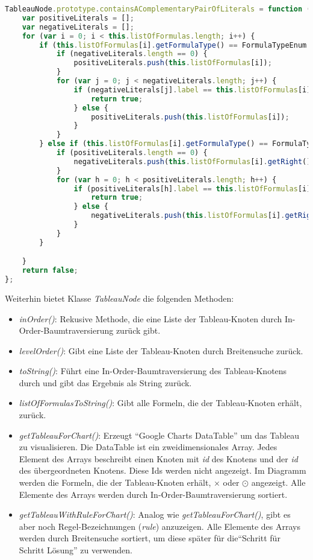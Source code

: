 \begin{itemize}
\begin{lstlisting}[language=JavaScript, caption= containsConstantFalse() (Klasse TableauNode), basicstyle=\scriptsize]
TableauNode.prototype.containsAComplementaryPairOfLiterals = function () {
    var positiveLiterals = [];
    var negativeLiterals = [];
    for (var i = 0; i < this.listOfFormulas.length; i++) {
        if (this.listOfFormulas[i].getFormulaType() == FormulaTypeEnum.POSITIVLITERAL) {
            if (negativeLiterals.length == 0) {
                positiveLiterals.push(this.listOfFormulas[i]);
            }
            for (var j = 0; j < negativeLiterals.length; j++) {
                if (negativeLiterals[j].label == this.listOfFormulas[i].getLabel()) {
                    return true;
                } else {
                    positiveLiterals.push(this.listOfFormulas[i]);
                }
            }
        } else if (this.listOfFormulas[i].getFormulaType() == FormulaTypeEnum.NEGATIVLITERAL) {
            if (positiveLiterals.length == 0) {
                negativeLiterals.push(this.listOfFormulas[i].getRight());
            }
            for (var h = 0; h < positiveLiterals.length; h++) {
                if (positiveLiterals[h].label == this.listOfFormulas[i].getRight().getLabel()) {
                    return true;
                } else {
                    negativeLiterals.push(this.listOfFormulas[i].getRight());
                }
            }
        }

    }
    return false;
};
\end{lstlisting}
\end{itemize}

Weiterhin bietet Klasse \textit{TableauNode} die folgenden Methoden:
\begin{itemize}
\item	\textit{inOrder()}: Rekusive Methode, die eine Liste der Tableau-Knoten durch In-Order-Baumtraversierung zurück gibt. 
\item	\textit{levelOrder()}: Gibt eine Liste der Tableau-Knoten durch Breitensuche zurück. 
\item	\textit{toString()}: Führt eine In-Order-Baumtraversierung des Tableau-Knotens durch und gibt das Ergebnis als String zurück.
\item	\textit{listOfFormulasToString()}: Gibt alle Formeln, die der Tableau-Knoten erhält, zurück.
\item	\textit{getTableauForChart()}: Erzeugt ``Google Charts DataTable'' um das Tableau zu visualisieren. Die DataTable ist ein zweidimensionales Array. Jedes Element des Arrays beschreibt einen Knoten mit \textit{id} des Knotens und der \textit{id} des übergeordneten Knotens. Diese Ids werden nicht angezeigt. Im Diagramm werden die Formeln, die der Tableau-Knoten erhält, $\times$ oder $\odot$ angezeigt. Alle Elemente des Arrays werden durch In-Order-Baumtraversierung sortiert.
\item	\textit{getTableauWithRuleForChart()}: Analog wie \textit{getTableauForChart()}, gibt es aber noch Regel-Bezeichnungen (\textit{rule}) anzuzeigen. Alle Elemente des Arrays werden durch Breitensuche sortiert, um diese später für die``Schritt für Schritt Lösung'' zu verwenden.
\end{itemize}

